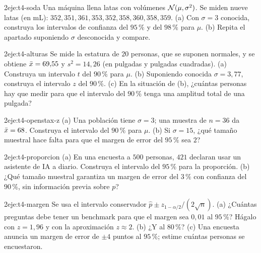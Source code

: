 \begin{ejercicio}{2}{eje:t4-soda}
Una máquina llena latas con volúmenes $\mathcal{N}(\mu,\sigma^{2})$. Se miden nueve latas (en mL): $352,351,361,353,352,358,360,358,359$. (a) Con $\sigma=3$ conocida, construya los intervalos de confianza del $95\,\%$ y del $98\,\%$ para $\mu$. (b) Repita el apartado suponiendo $\sigma$ desconocida y compare.
\end{ejercicio}

\begin{ejercicio}{2}{eje:t4-alturas}
Se mide la estatura de $20$ personas, que se suponen normales, y se obtiene $\bar{x}=69{,}55$ y $s^{2}=14{,}26$ (en pulgadas y pulgadas cuadradas). (a) Construya un intervalo $t$ del $90\,\%$ para $\mu$. (b) Suponiendo conocida $\sigma=3{,}77$, construya el intervalo $z$ del $90\,\%$. (c) En la situación de (b), ¿cuántas personas hay que medir para que el intervalo del $90\,\%$ tenga una amplitud total de una pulgada?
\end{ejercicio}

\begin{ejercicio}{2}{eje:t4-openstax-z}
(a) Una población tiene $\sigma=3$; una muestra de $n=36$ da $\bar{x}=68$. Construya el intervalo del $90\,\%$ para $\mu$. (b) Si $\sigma=15$, ¿qué tamaño muestral hace falta para que el margen de error del $95\,\%$ sea $2$?
\end{ejercicio}

\begin{ejercicio}{2}{eje:t4-proporcion}
(a) En una encuesta a $500$ personas, $421$ declaran usar un asistente de IA a diario. Construya el intervalo del $95\,\%$ para la proporción. (b) ¿Qué tamaño muestral garantiza un margen de error del $3\,\%$ con confianza del $90\,\%$, sin información previa sobre $p$?
\end{ejercicio}

\begin{ejercicio}{2}{eje:t4-margen}
Se usa el intervalo conservador $\widehat p\pm z_{1-\alpha/2}/(2\sqrt n)$. (a) ¿Cuántas preguntas debe tener un benchmark para que el margen sea $0{,}01$ al $95\,\%$? Hágalo con $z=1{,}96$ y con la aproximación $z\approx2$. (b) ¿Y al $80\,\%$? (c) Una encuesta anuncia un margen de error de $\pm4$ puntos al $95\,\%$; estime cuántas personas se encuestaron.
\end{ejercicio}

